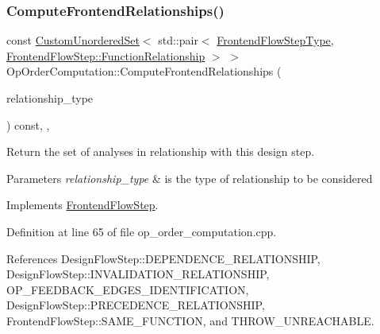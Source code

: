 \subsubsection{\texorpdfstring{Compute\+Frontend\+Relationships()}{ComputeFrontendRelationships()}}
{\footnotesize\ttfamily const \hyperlink{classCustomUnorderedSet}{Custom\+Unordered\+Set}$<$ std\+::pair$<$ \hyperlink{frontend__flow__step_8hpp_afeb3716c693d2b2e4ed3e6d04c3b63bb}{Frontend\+Flow\+Step\+Type}, \hyperlink{classFrontendFlowStep_af7cf30f2023e5b99e637dc2058289ab0}{Frontend\+Flow\+Step\+::\+Function\+Relationship} $>$ $>$ Op\+Order\+Computation\+::\+Compute\+Frontend\+Relationships (\begin{DoxyParamCaption}\item[{const \hyperlink{classDesignFlowStep_a723a3baf19ff2ceb77bc13e099d0b1b7}{Design\+Flow\+Step\+::\+Relationship\+Type}}]{relationship\+\_\+type }\end{DoxyParamCaption}) const\hspace{0.3cm}{\ttfamily [override]}, {\ttfamily [private]}, {\ttfamily [virtual]}}



Return the set of analyses in relationship with this design step. 


\begin{DoxyParams}{Parameters}
{\em relationship\+\_\+type} & is the type of relationship to be considered \\
\hline
\end{DoxyParams}


Implements \hyperlink{classFrontendFlowStep_abeaff70b59734e462d347ed343dd700d}{Frontend\+Flow\+Step}.



Definition at line 65 of file op\+\_\+order\+\_\+computation.\+cpp.



References Design\+Flow\+Step\+::\+D\+E\+P\+E\+N\+D\+E\+N\+C\+E\+\_\+\+R\+E\+L\+A\+T\+I\+O\+N\+S\+H\+IP, Design\+Flow\+Step\+::\+I\+N\+V\+A\+L\+I\+D\+A\+T\+I\+O\+N\+\_\+\+R\+E\+L\+A\+T\+I\+O\+N\+S\+H\+IP, O\+P\+\_\+\+F\+E\+E\+D\+B\+A\+C\+K\+\_\+\+E\+D\+G\+E\+S\+\_\+\+I\+D\+E\+N\+T\+I\+F\+I\+C\+A\+T\+I\+ON, Design\+Flow\+Step\+::\+P\+R\+E\+C\+E\+D\+E\+N\+C\+E\+\_\+\+R\+E\+L\+A\+T\+I\+O\+N\+S\+H\+IP, Frontend\+Flow\+Step\+::\+S\+A\+M\+E\+\_\+\+F\+U\+N\+C\+T\+I\+ON, and T\+H\+R\+O\+W\+\_\+\+U\+N\+R\+E\+A\+C\+H\+A\+B\+LE.

\mbox{\label{classOpOrderComputation_a188a6be8efc8b80fd9ed85c19ceac824}} 
